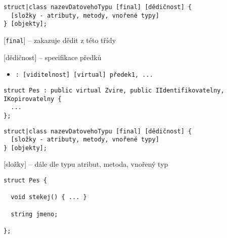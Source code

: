 \begin{frame}[fragile]
\begin{noteblock}{}
\begin{lstlisting}[basicstyle=\scriptsize]
struct|class nazevDatovehoTypu [final] [dědičnost] {
  [složky - atributy, metody, vnořené typy]
} [objekty];
\end{lstlisting}
\end{noteblock}

\begin{bitemize}
\item{} [\lstinline|final|] -- zakazuje dědit z této třídy
\item{} [dědičnost] -- specifikace předků
\begin{itemize}
\item \lstinline|: [viditelnost] [virtual] předek1, ...|
\end{itemize}
\end{bitemize}

\begin{yesblock}
\begin{lstlisting}
struct Pes : public virtual Zvire, public IIdentifikovatelny, IKopirovatelny {
  ...
};
\end{lstlisting}
\end{yesblock}
\end{frame}



\begin{frame}[fragile]
\begin{noteblock}{}
\begin{lstlisting}[basicstyle=\scriptsize]
struct|class nazevDatovehoTypu [final] [dědičnost] {
  [složky - atributy, metody, vnořené typy]
} [objekty];
\end{lstlisting}
\end{noteblock}

\begin{bitemize}
\item{} [složky] -- dále dle typu atribut, metoda, vnořený typ
\end{bitemize}

\begin{yesblock}
\begin{lstlisting}
struct Pes {

  void stekej() { ... }

  string jmeno;

};
\end{lstlisting}
\end{yesblock}
\end{frame}

